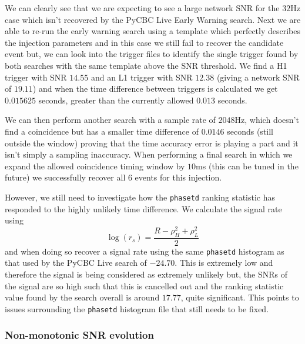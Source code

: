 %
We can clearly see that we are expecting to see a large network SNR for the $32$Hz case which isn't recovered by the PyCBC Live Early Warning search. Next we are able to re-run the early warning search using a template which perfectly describes the injection parameters and in this case we still fail to recover the candidate event but, we can look into the trigger files to identify the single trigger found by both searches with the same template above the SNR threshold. We find a H1 trigger with SNR $14.55$ and an L1 trigger with SNR $12.38$ (giving a network SNR of $19.11$) and when the time difference between triggers is calculated we get $0.015625$ seconds, greater than the currently allowed $0.013$ seconds. 

We can then perform another search with a sample rate of $2048$Hz, which doesn't find a coincidence but has a smaller time difference of $0.0146$ seconds (still outside the window) proving that the time accuracy error is playing a part and it isn't simply a sampling inaccuracy. When performing a final search in which we expand the allowed coincidence timing window by $10$ms (this can be tuned in the future) we successfully recover all $6$ events for this injection.

However, we still need to investigate how the \verb|phasetd| ranking statistic has responded to the highly unlikely time difference. We calculate the signal rate using
%
\begin{equation}
    \log(r_s) = \frac{R - \rho_{H}^{2} + \rho_{L}^2}{2}
\end{equation}
%
and when doing so recover a signal rate using the same \verb|phasetd| histogram as that used by the PyCBC Live search of $-24.70$. This is extremely low and therefore the signal is being considered as extremely unlikely but, the SNRs of the signal are so high such that this is cancelled out and the ranking statistic value found by the search overall is around $17.77$, quite significant. This points to issues surrounding the \verb|phasetd| histogram file that still needs to be fixed.

\subsubsection{\label{6:sec:non-mono-snr}Non-monotonic SNR evolution}

